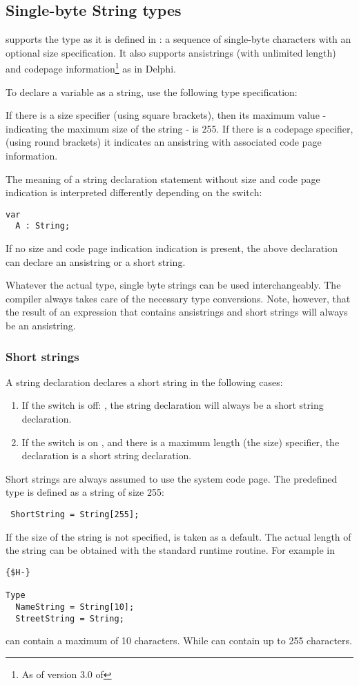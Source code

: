 \subsection{Single-byte String types}
 
\fpc supports the  type as it is defined in \tp:
a sequence of single-byte characters with an optional size specification.
It also supports ansistrings (with unlimited length) and codepage information\footnote{As of version 3.0 of \fpc} as in Delphi.

To declare a variable as a string, use the following type specification:

If there is a size specifier (using square brackets), then its maximum value - indicating the maximum 
size of the string - is 255. If there is a codepage specifier, (using round brackets) it indicates an 
ansistring with associated code page information.

The meaning of a string declaration statement without size and code page indication is 
interpreted differently depending on the  switch:
\begin{verbatim}
var
  A : String;
\end{verbatim}
If no size and code page indication indication is present, the above declaration can declare 
an ansistring or a short string.

Whatever the actual type, single byte strings can be used interchangeably. 
The compiler always takes care of the necessary type conversions. 
Note, however, that the result of an expression that contains ansistrings and short strings will always be an ansistring.

\subsubsection{Short strings}
 
A string declaration declares a short string in the following cases:
\begin{enumerate}
\item If the  switch is off: , the string declaration will always be a short string declaration.
\item If the switch is on , and there is a maximum length (the size) specifier, the declaration is a short 
string declaration.
\end{enumerate}
Short strings are always assumed to use the system code page.
The predefined type  is defined as a string of size 255:
\begin{verbatim}
 ShortString = String[255];
\end{verbatim}
If the size of the string is not specified,  is taken as a default. 
The actual length of the string can be obtained with the
 standard runtime routine.
For example in
\begin{verbatim}
{$H-}

Type
  NameString = String[10];
  StreetString = String;
\end{verbatim}
 can contain a maximum of 10 characters. While
 can contain up to 255 characters.

